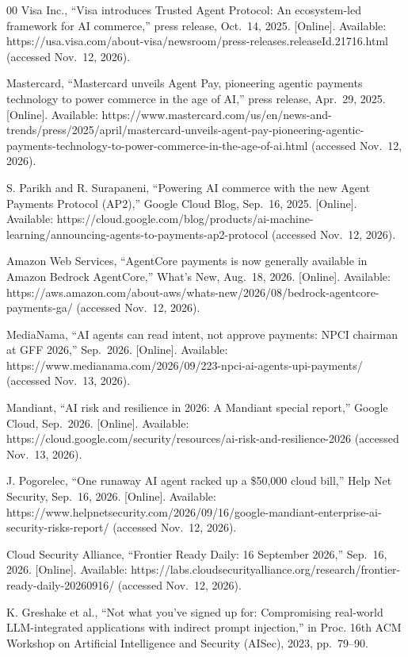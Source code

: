 \documentclass[conference]{IEEEtran}
\begin{document}
\begin{thebibliography}{00}
 Visa Inc., ``Visa introduces Trusted Agent Protocol: An ecosystem-led framework for AI commerce,'' press release, Oct.~14, 2025. {[}Online{]}. Available: https://usa.visa.com/about-visa/newsroom/press-releases.releaseId.21716.html (accessed Nov.~12, 2026).

 Mastercard, ``Mastercard unveils Agent Pay, pioneering agentic payments technology to power commerce in the age of AI,'' press release, Apr.~29, 2025. {[}Online{]}. Available: https://www.mastercard.com/us/en/news-and-trends/press/2025/april/mastercard-unveils-agent-pay-pioneering-agentic-payments-technology-to-power-commerce-in-the-age-of-ai.html (accessed Nov.~12, 2026).

 S. Parikh and R. Surapaneni, ``Powering AI commerce with the new Agent Payments Protocol (AP2),'' Google Cloud Blog, Sep.~16, 2025. {[}Online{]}. Available: https://cloud.google.com/blog/products/ai-machine-learning/announcing-agents-to-payments-ap2-protocol (accessed Nov.~12, 2026).

 Amazon Web Services, ``AgentCore payments is now generally available in Amazon Bedrock AgentCore,'' What's New, Aug.~18, 2026. {[}Online{]}. Available: https://aws.amazon.com/about-aws/whats-new/2026/08/bedrock-agentcore-payments-ga/ (accessed Nov.~12, 2026).

 MediaNama, ``AI agents can read intent, not approve payments: NPCI chairman at GFF 2026,'' Sep.~2026. [Online]. Available: https://www.medianama.com/2026/09/223-npci-ai-agents-upi-payments/ (accessed Nov.~13, 2026).

 Mandiant, ``AI risk and resilience in 2026: A Mandiant special report,'' Google Cloud, Sep.~2026. [Online]. Available: https://cloud.google.com/security/resources/ai-risk-and-resilience-2026 (accessed Nov.~13, 2026).

 J. Pogorelec, ``One runaway AI agent racked up a \$50,000 cloud bill,'' Help Net Security, Sep.~16, 2026. {[}Online{]}. Available: https://www.helpnetsecurity.com/2026/09/16/google-mandiant-enterprise-ai-security-risks-report/ (accessed Nov.~12, 2026).

 Cloud Security Alliance, ``Frontier Ready Daily: 16 September 2026,'' Sep.~16, 2026. {[}Online{]}. Available: https://labs.cloudsecurityalliance.org/research/frontier-ready-daily-20260916/ (accessed Nov.~12, 2026).

 K. Greshake et al., ``Not what you've signed up for: Compromising real-world LLM-integrated applications with indirect prompt injection,'' in Proc. 16th ACM Workshop on Artificial Intelligence and Security (AISec), 2023, pp.~79--90.


\end{thebibliography}
\end{document}
